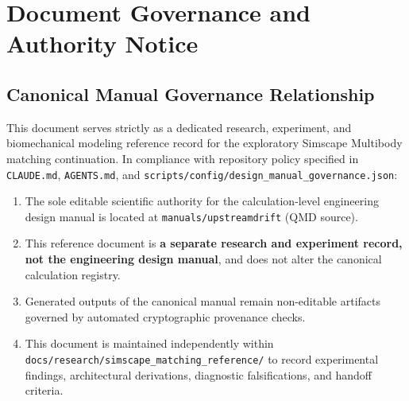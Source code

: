 \documentclass[11pt,a4paper]{article}
\begin{document}
\section{Document Governance and Authority Notice}

\subsection{Canonical Manual Governance Relationship}
This document serves strictly as a dedicated research, experiment, and biomechanical modeling reference record for the exploratory Simscape Multibody matching continuation. In compliance with repository policy specified in \texttt{CLAUDE.md}, \texttt{AGENTS.md}, and \nolinkurl{scripts/config/design_manual_governance.json}:
\begin{enumerate}
    \item The sole editable scientific authority for the calculation-level engineering design manual is located at \texttt{manuals/upstreamdrift} (QMD source).
    \item This reference document is \textbf{a separate research and experiment record, not the engineering design manual}, and does not alter the canonical calculation registry.
    \item Generated outputs of the canonical manual remain non-editable artifacts governed by automated cryptographic provenance checks.
    \item This document is maintained independently within \nolinkurl{docs/research/simscape_matching_reference/} to record experimental findings, architectural derivations, diagnostic falsifications, and handoff criteria.
\end{enumerate}
\end{document}
